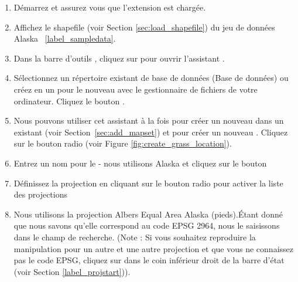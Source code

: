 \begin{enumerate}
  \item Démarrez \qg et assurez vous que l'extension \grass est chargée.
  \item Affichez le shapefile  (voir Section \ref{sec:load_shapefile}) du jeu de données \qg Alaska ~\ref{label_sampledata}.
  \item Dans la barre d'outils \grass, cliquez sur  pour ouvrir l'assistant .
  \item Sélectionnez un répertoire existant de base de données \grass (Base de données)  ou créez en un pour le nouveau  avec le gestionnaire de fichiers de votre ordinateur. Cliquez le bouton .
  \item Nous pouvons utiliser cet assistant à la fois pour créer un nouveau  dans un  existant (voir Section~\ref{sec:add_mapset}) et pour créer un nouveau . Cliquez sur le bouton radio  (voir Figure \ref{fig:create_grass_location}).
  \item Entrez un nom pour le  - nous utilisons Alaska et cliquez sur le bouton 
  \item Définissez la projection en cliquant sur le bouton radio  pour activer la liste des projections
  \item Nous utilisons la projection Albers Equal Area Alaska (pieds).Étant donné que nous savons qu'elle correspond au code EPSG 2964, nous le saisissons dans le champ de recherche. (Note : Si vous souhaitez reproduire la manipulation pour un autre  et une autre projection et que vous ne connaissez pas le code EPSG, cliquez sur  dans le coin inférieur droit de la barre d'état (voir Section \ref{label_projstart})).

\end{enumerate}
